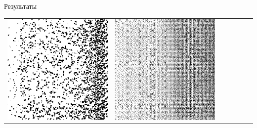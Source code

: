 \documentclass[12pt]{beamer}
\begin{document}
\begin{frame}{Результаты}
\begin{table}
\begin{center}
\begin{tabular}{p{1.2cm} p{1.2cm} p{1.2cm} p{1.2cm} p{1.2cm} p{1.2cm} p{1.2cm}}
					\includegraphics[width=1\linewidth]{8-results/sand-trend8/nf32e5/gen2}
					&
					\includegraphics[width=1\linewidth]{8-results/sand-trend8/nf64e1/gen2}
					&

\end{tabular}
\end{center}
\end{table}
\end{frame}
\end{document}
